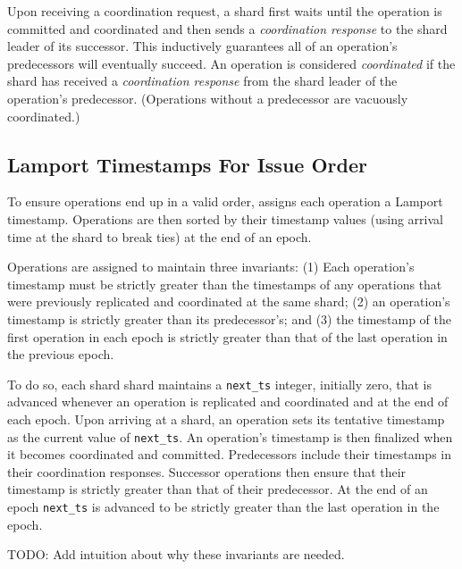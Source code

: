 Upon receiving a coordination request, a shard first waits until the operation
is committed and coordinated and then sends a \textit{coordination response} to
the shard leader of its successor. This inductively guarantees all of an
operation's predecessors will eventually succeed. An operation is considered
\textit{coordinated} if the shard has received a \textit{coordination response}
from the shard leader of the operation's predecessor.  (Operations without a
predecessor are vacuously coordinated.)

\subsection{Lamport Timestamps For Issue Order}\label{sec:design:timestamps}


To ensure operations end up in a valid \MDL{} order, \sys{} assigns each operation a Lamport timestamp.
Operations are then sorted by their timestamp values (using arrival time at the shard to break ties)
at the end of an epoch.

Operations are assigned to maintain three invariants: (1) Each operation's timestamp must
be strictly greater than the timestamps of any operations that were previously replicated and coordinated
at the same shard; (2) an operation's timestamp is strictly greater than its predecessor's; and (3)
the timestamp of the first operation in each epoch is strictly greater than that of the last operation
in the previous epoch. 

To do so, each shard shard maintains a \texttt{next\_ts} integer, initially zero, that is advanced whenever
an operation is replicated and coordinated and at the end of each epoch. Upon arriving at a shard, an operation
sets its tentative timestamp as the current value of \texttt{next\_ts}. An operation's timestamp is then
finalized when it becomes coordinated and committed. Predecessors include their timestamps in their coordination
responses. Successor operations then ensure that their timestamp is strictly greater than that
of their predecessor. At the end of an epoch \texttt{next\_ts} is advanced to be strictly greater than the last
operation in the epoch.

TODO: Add intuition about why these invariants are needed.


